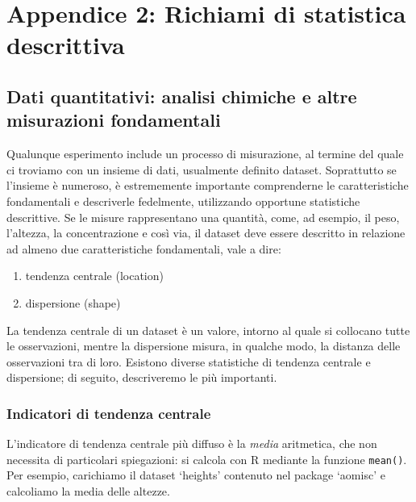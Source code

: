 \documentclass[a4paper,12pt,oneside]{book}
\providecommand{\tightlist}{%
  \setlength{\itemsep}{0pt}\setlength{\parskip}{0pt}}
\begin{document}
\hypertarget{appendice-2-richiami-di-statistica-descrittiva}{%
\chapter{Appendice 2: Richiami di statistica descrittiva}\label{appendice-2-richiami-di-statistica-descrittiva}}

\hypertarget{dati-quantitativi-analisi-chimiche-e-altre-misurazioni-fondamentali}{%
\section*{Dati quantitativi: analisi chimiche e altre misurazioni fondamentali}\label{dati-quantitativi-analisi-chimiche-e-altre-misurazioni-fondamentali}}

Qualunque esperimento include un processo di misurazione, al termine del quale ci troviamo con un insieme di dati, usualmente definito dataset. Soprattutto se l'insieme è numeroso, è estrememente importante comprenderne le caratteristiche fondamentali e descriverle fedelmente, utilizzando opportune statistiche descrittive. Se le misure rappresentano una quantità, come, ad esempio, il peso, l'altezza, la concentrazione e così via, il dataset deve essere descritto in relazione ad almeno due caratteristiche fondamentali, vale a dire:

\begin{enumerate}
\def\labelenumi{\arabic{enumi}.}
\tightlist
\item
  tendenza centrale (location)
\item
  dispersione (shape)
\end{enumerate}

La tendenza centrale di un dataset è un valore, intorno al quale si collocano tutte le osservazioni, mentre la dispersione misura, in qualche modo, la distanza delle osservazioni tra di loro. Esistono diverse statistiche di tendenza centrale e dispersione; di seguito, descriveremo le più importanti.

\hypertarget{indicatori-di-tendenza-centrale}{%
\subsection*{Indicatori di tendenza centrale}\label{indicatori-di-tendenza-centrale}}

L'indicatore di tendenza centrale più diffuso è la \emph{media} aritmetica, che non necessita di particolari spiegazioni: si calcola con R mediante la funzione \texttt{mean()}. Per esempio, carichiamo il dataset `heights' contenuto nel package `aomisc' e calcoliamo la media delle altezze.
\end{document}
